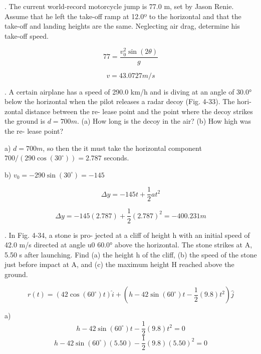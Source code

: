 \documentclass{scrreprt} %
\begin{document}
. The current world-record motorcycle jump is 77.0 m,
set  by  Jason  Renie. Assume  that he  left  the  take-off  ramp  at  
12.0º to the horizontal and that the take-off and landing 
heights are the same. Neglecting air drag, determine his take-off
speed.

$$77=\frac{v_0^2\sin(2\theta)}{g}$$

$$\boxed{v = 43.0727 m/s}$$

. A certain airplane has a
speed  of  290.0 km/h  and  is  diving
at  an  angle  of 30.0° below  the
horizontal  when  the pilot  releases
a radar decoy (Fig. 4-33). The hori-
zontal distance between the re-
lease  point  and  the  point  where
the decoy strikes the ground is $d =
700 m$. (a) How long is the decoy in
the  air?  (b)  How  high  was  the  re-
lease point?

a) $d = 700m$, so then the it must take the horizontal component
$700/(290\cos(30^\circ))=\boxed{2.787}$ seconds.

b) $v_0 = -290\sin(30^\circ) = -145$

$$\Delta y = -145t + \frac{1}{2}at^2$$

$$\Delta y = -145(2.787) + \frac{1}{2}(2.787)^2 = \boxed{-400.231 m}$$

. In Fig. 4-34, a stone is pro-
jected at a cliff of height h with an initial speed of 42.0 m/s directed
at  angle  u0 60.0° above  the  horizontal. The  stone  strikes  at  A,
5.50 s  after  launching. Find  (a)  the  height  h of  the  cliff, (b)  the
speed of the stone just before impact at A, and (c) the maximum
height H reached above the ground.

$$r(t) = (42\cos(60^\circ)t)\hat{i} + (h - 42\sin(60^\circ)t - \frac{1}{2}(9.8)t^2)\hat{j}$$

a)  $$h-42\sin(60^\circ)t - \frac{1}{2}(9.8)t^2 = 0$$
	$$h-42\sin(60^\circ)(5.50) - \frac{1}{2}(9.8)(5.50)^2 = 0$$
\end{document}
